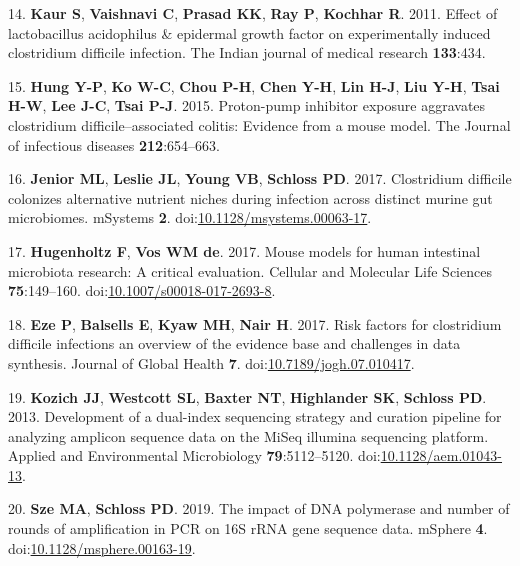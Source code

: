 \documentclass[11pt,]{article}
\begin{document}
\hypertarget{ref-kaur2011effect}{}
14. \textbf{Kaur S}, \textbf{Vaishnavi C}, \textbf{Prasad KK},
\textbf{Ray P}, \textbf{Kochhar R}. 2011. Effect of lactobacillus
acidophilus \& epidermal growth factor on experimentally induced
clostridium difficile infection. The Indian journal of medical research
\textbf{133}:434.

\hypertarget{ref-hung2015proton}{}
15. \textbf{Hung Y-P}, \textbf{Ko W-C}, \textbf{Chou P-H}, \textbf{Chen
Y-H}, \textbf{Lin H-J}, \textbf{Liu Y-H}, \textbf{Tsai H-W}, \textbf{Lee
J-C}, \textbf{Tsai P-J}. 2015. Proton-pump inhibitor exposure aggravates
clostridium difficile--associated colitis: Evidence from a mouse model.
The Journal of infectious diseases \textbf{212}:654--663.

\hypertarget{ref-Jenior2017}{}
16. \textbf{Jenior ML}, \textbf{Leslie JL}, \textbf{Young VB},
\textbf{Schloss PD}. 2017. Clostridium difficile colonizes alternative
nutrient niches during infection across distinct murine gut microbiomes.
mSystems \textbf{2}.
doi:\href{https://doi.org/10.1128/msystems.00063-17}{10.1128/msystems.00063-17}.

\hypertarget{ref-Hugenholtz2017}{}
17. \textbf{Hugenholtz F}, \textbf{Vos WM de}. 2017. Mouse models for
human intestinal microbiota research: A critical evaluation. Cellular
and Molecular Life Sciences \textbf{75}:149--160.
doi:\href{https://doi.org/10.1007/s00018-017-2693-8}{10.1007/s00018-017-2693-8}.

\hypertarget{ref-Eze2017}{}
18. \textbf{Eze P}, \textbf{Balsells E}, \textbf{Kyaw MH}, \textbf{Nair
H}. 2017. Risk factors for clostridium difficile infections an overview
of the evidence base and challenges in data synthesis. Journal of Global
Health \textbf{7}.
doi:\href{https://doi.org/10.7189/jogh.07.010417}{10.7189/jogh.07.010417}.

\hypertarget{ref-Kozich2013}{}
19. \textbf{Kozich JJ}, \textbf{Westcott SL}, \textbf{Baxter NT},
\textbf{Highlander SK}, \textbf{Schloss PD}. 2013. Development of a
dual-index sequencing strategy and curation pipeline for analyzing
amplicon sequence data on the MiSeq illumina sequencing platform.
Applied and Environmental Microbiology \textbf{79}:5112--5120.
doi:\href{https://doi.org/10.1128/aem.01043-13}{10.1128/aem.01043-13}.

\hypertarget{ref-Sze2019}{}
20. \textbf{Sze MA}, \textbf{Schloss PD}. 2019. The impact of DNA
polymerase and number of rounds of amplification in PCR on 16S rRNA gene
sequence data. mSphere \textbf{4}.
doi:\href{https://doi.org/10.1128/msphere.00163-19}{10.1128/msphere.00163-19}.
\end{document}
